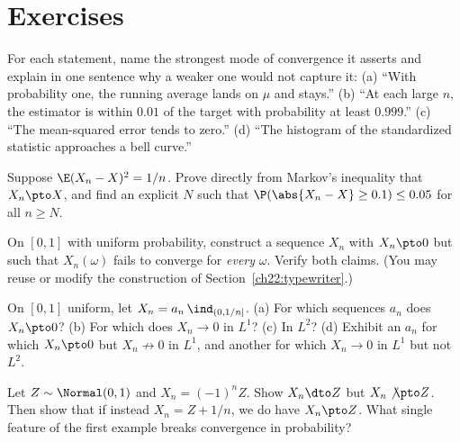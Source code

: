 \section{Exercises}
\label{ch22:exercises}

\begin{exercise}
\label{ch22:exr-defs}
For each statement, name the strongest mode of convergence it asserts and explain in
one sentence why a weaker one would not capture it:
(a) ``With probability one, the running average lands on $\mu$ and stays.''
(b) ``At each large $n$, the estimator is within $0.01$ of the target with probability
at least $0.999$.''
(c) ``The mean-squared error tends to zero.''
(d) ``The histogram of the standardized statistic approaches a bell curve.''
\end{exercise}

\begin{exercise}
\label{ch22:exr-markov}
Suppose $\E(X_n - X)^2 = 1/n$. Prove directly from Markov's inequality that
$X_n\pto X$, and find an explicit $N$ such that $\P(\abs{X_n - X}\ge 0.1)\le 0.05$ for
all $n\ge N$.
\end{exercise}

\begin{exercise}
\label{ch22:exr-typewriter}
On $[0,1]$ with uniform probability, construct a sequence $X_n$ with $X_n\pto0$ but
such that $X_n(\omega)$ fails to converge for \emph{every} $\omega$. Verify both
claims. (You may reuse or modify the construction of
Section~\ref{ch22:typewriter}.)
\end{exercise}

\begin{exercise}
\label{ch22:exr-giant}
On $[0,1]$ uniform, let $X_n = a_n\,\ind_{(0,1/n]}$. (a) For which sequences $a_n$ does
$X_n\pto0$? (b) For which does $X_n\to0$ in $L^1$? (c) In $L^2$? (d) Exhibit an $a_n$
for which $X_n\pto0$ but $X_n\not\to0$ in $L^1$, and another for which $X_n\to0$ in
$L^1$ but not $L^2$.
\end{exercise}

\begin{exercise}
\label{ch22:exr-d-not-p}
Let $Z\sim\Normal(0,1)$ and $X_n = (-1)^n Z$. Show $X_n\dto Z$ but $X_n\not\pto Z$.
Then show that if instead $X_n = Z + 1/n$, we do have $X_n\pto Z$. What single feature
of the first example breaks convergence in probability?
\end{exercise}

